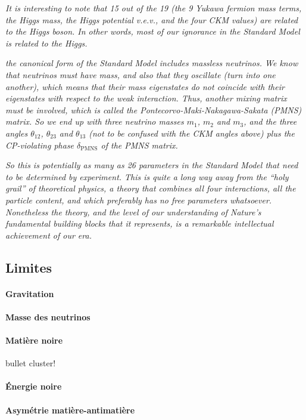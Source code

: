 \emph{It is interesting to note that 15 out of the 19 (the 9 Yukawa fermion mass terms, the Higgs mass, the Higgs potential v.e.v., and the four CKM values) are related to the Higgs boson. In other words, most of our ignorance in the Standard Model is related to the Higgs.}

\emph{the canonical form of the Standard Model includes massless neutrinos. We know that neutrinos must have mass, and also that they oscillate (turn into one another), which means that their mass eigenstates do not coincide with their eigenstates with respect to the weak interaction. Thus, another mixing matrix must be involved, which is called the Pontecorvo-Maki-Nakagawa-Sakata (PMNS) matrix. So we end up with three neutrino masses $m_1$, $m_2$ and $m_3$, and the three angles $\theta_{12}$, $\theta_{23}$ and $\theta_{13}$ (not to be confused with the CKM angles above) plus the CP-violating phase $\delta_{\text{PMNS}}$ of the PMNS matrix.}

\emph{So this is potentially as many as 26 parameters in the Standard Model that need to be determined by experiment. This is quite a long way away from the “holy grail” of theoretical physics, a theory that combines all four interactions, all the particle content, and which preferably has no free parameters whatsoever. Nonetheless the theory, and the level of our understanding of Nature’s fundamental building blocks that it represents, is a remarkable intellectual achievement of our era.}

\subsection{Limites}\label{chapter-MS-MSSM-section-succes_limites-subsec-limites}
\paragraph{Gravitation}
\paragraph{Masse des neutrinos}
\paragraph{Matière noire}
bullet cluster!\cite{Clowe_2006}
\paragraph{Énergie noire}
\paragraph{Asymétrie matière-antimatière}
